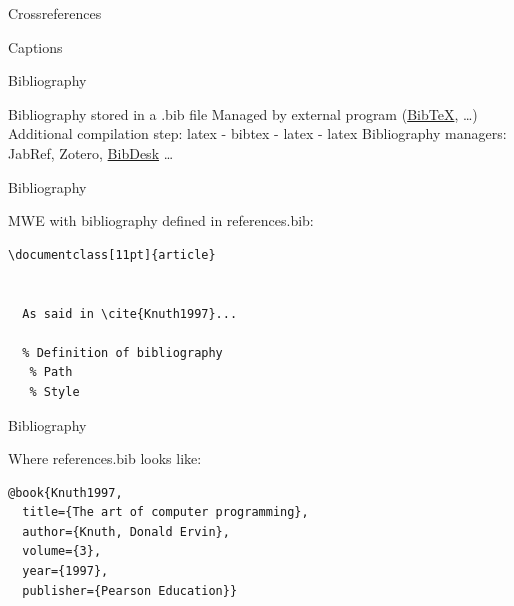 \begin{frame}{Crossreferences}

\end{frame}

\begin{frame}{Captions}
\end{frame}

\begin{frame}{Bibliography}
 \begin{fullpageitemize}
  \itemR Bibliography stored in a {\inconsolatafont .bib} file 
  \itemR Managed by external program (\href{http://www.bibtex.org/}{BibTeX}, \ldots) 
  \itemR Additional compilation step: {\inconsolatafont latex - bibtex - latex - latex}
  \itemR Bibliography managers: JabRef, Zotero, \href{https://bibdesk.sourceforge.io/}{BibDesk} \ldots
 \end{fullpageitemize}
 
\end{frame}

\begin{frame}[fragile]{Bibliography}

MWE with bibliography defined in {\inconsolatafont references.bib}:

\begin{lstlisting}[language={[LaTeX]TeX},texcsstyle=*\color{colororange}]
\documentclass[11pt]{article}
  
  
  As said in \cite{Knuth1997}...
    
  % Definition of bibliography
   % Path
   % Style

\end{lstlisting}


\end{frame}

\begin{frame}[fragile]{Bibliography}

Where {\inconsolatafont references.bib} looks like:

\begin{lstlisting}[breaklines=false]
@book{Knuth1997,
  title={The art of computer programming},
  author={Knuth, Donald Ervin},
  volume={3},
  year={1997},
  publisher={Pearson Education}}
\end{lstlisting}
\end{frame}

